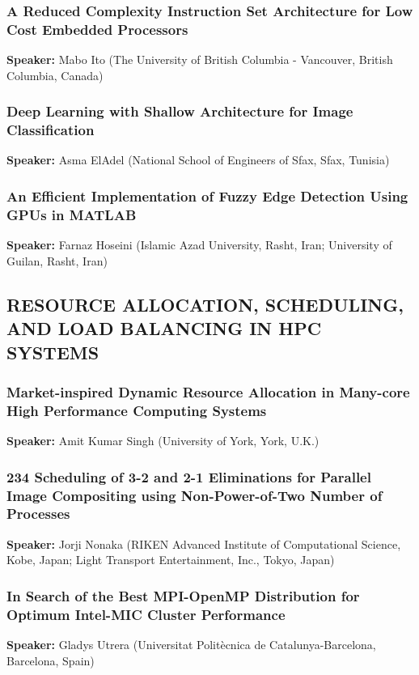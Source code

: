 \documentclass[twocolumn]{article}
\begin{document}
\subsubsection{A Reduced Complexity Instruction Set Architecture for Low Cost Embedded Processors}
\textbf{Speaker:} Mabo Ito (The University of British Columbia - Vancouver, British Columbia, Canada)

\subsubsection{Deep Learning with Shallow Architecture for Image Classification}
\textbf{Speaker:} Asma ElAdel (National School of Engineers of Sfax, Sfax, Tunisia)

\subsubsection{An Efficient Implementation of Fuzzy Edge Detection Using GPUs in MATLAB}
\textbf{Speaker:} Farnaz Hoseini (Islamic Azad University, Rasht, Iran; University of Guilan, Rasht, Iran)

\subsection{RESOURCE ALLOCATION, SCHEDULING, AND LOAD BALANCING IN HPC SYSTEMS}
\subsubsection{Market-inspired Dynamic Resource Allocation in Many-core High Performance Computing Systems}
\textbf{Speaker:} Amit Kumar Singh (University of York, York, U.K.)
\subsubsection{234 Scheduling of 3-2 and 2-1 Eliminations for Parallel Image Compositing using Non-Power-of-Two Number of Processes}
\textbf{Speaker:} Jorji Nonaka (RIKEN Advanced Institute of Computational Science, Kobe, Japan; Light Transport Entertainment, Inc., Tokyo, Japan)
\subsubsection{In Search of the Best MPI-OpenMP Distribution for Optimum Intel-MIC Cluster Performance}
\textbf{Speaker:} Gladys Utrera (Universitat Politècnica de Catalunya-Barcelona, Barcelona, Spain)






\end{document}
